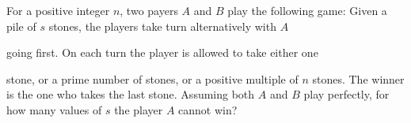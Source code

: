 For a positive integer $n$, two payers $A$ and $B$ play the following game: Given a pile of $s$ stones, the players take turn alternatively with $A$

 going first. On each turn the player is allowed to take either one 

stone, or a prime number of stones, or a positive multiple of $n$ stones. The winner is the one who takes the last stone. Assuming both $A$ and $B$ play perfectly, for how many values of $s$ the player $A$ cannot win?